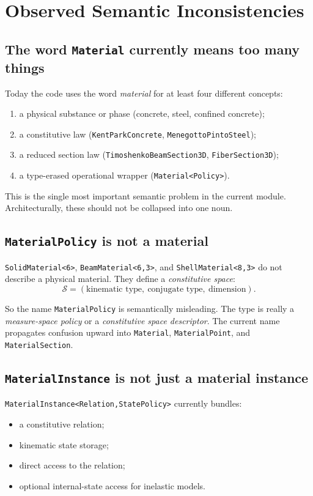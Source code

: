\section{Observed Semantic Inconsistencies}

\subsection{The word \texttt{Material} currently means too many things}

Today the code uses the word \emph{material} for at least four different
concepts:
\begin{enumerate}
  \item a physical substance or phase
        (concrete, steel, confined concrete);
  \item a constitutive law
        (\texttt{KentParkConcrete}, \texttt{MenegottoPintoSteel});
  \item a reduced section law
        (\texttt{TimoshenkoBeamSection3D}, \texttt{FiberSection3D});
  \item a type-erased operational wrapper
        (\texttt{Material<Policy>}).
\end{enumerate}

This is the single most important semantic problem in the current module.
Architecturally, these should not be collapsed into one noun.

\subsection{\texttt{MaterialPolicy} is not a material}

\texttt{SolidMaterial<6>}, \texttt{BeamMaterial<6,3>}, and
\texttt{ShellMaterial<8,3>} do not describe a physical material.  They define
a \emph{constitutive space}:
\[
\mathcal{S} =
(\text{kinematic type},\ \text{conjugate type},\ \text{dimension}).
\]

So the name \texttt{MaterialPolicy} is semantically misleading.  The type is
really a \emph{measure-space policy} or a \emph{constitutive space descriptor}.
The current name propagates confusion upward into \texttt{Material},
\texttt{MaterialPoint}, and \texttt{MaterialSection}.

\subsection{\texttt{MaterialInstance} is not just a material instance}

\texttt{MaterialInstance<Relation,StatePolicy>} currently bundles:
\begin{itemize}
  \item a constitutive relation;
  \item kinematic state storage;
  \item direct access to the relation;
  \item optional internal-state access for inelastic models.
\end{itemize}

